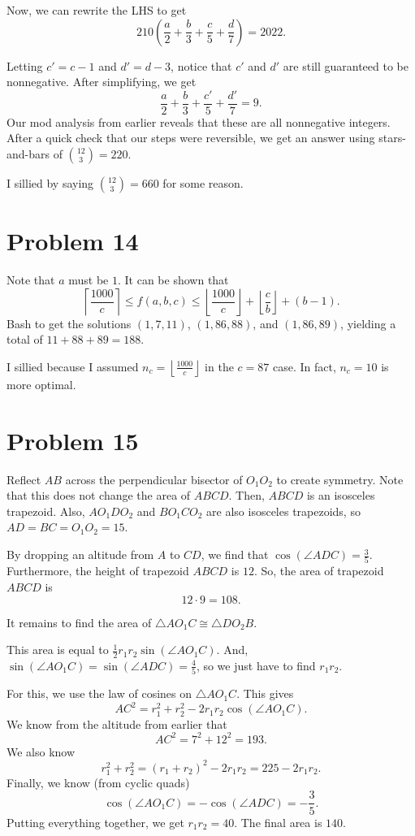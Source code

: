 \documentclass{scrartcl}
\begin{document}
Now, we can rewrite the LHS to get
\[ 210\left(\frac{a}{2} + \frac{b}{3} + \frac{c}{5} + \frac{d}{7}\right) = 2022. \]

Letting $c' = c-1$ and $d' = d-3$, notice that $c'$ and $d'$ are still guaranteed to be nonnegative.
After simplifying, we get
\[ \frac{a}{2} + \frac{b}{3} + \frac{c'}{5} + \frac{d'}{7} = 9. \]
Our mod analysis from earlier reveals that these are all nonnegative integers.
After a quick check that our steps were reversible,
we get an answer using stars-and-bars of $\binom{12}{3} = \boxed{220}$.
\begin{remark*}
    I sillied by saying $\binom{12}{3} = 660$ for some reason.
\end{remark*}

\section*{Problem 14}
Note that $a$ must be $1$.
It can be shown that
\[ \left\lceil \frac{1000}{c} \right\rceil \le f(a,b,c) \le \left\lfloor \frac{1000}{c} \right\rfloor + \left\lfloor \frac{c}{b} \right\rfloor + (b-1). \]
Bash to get the solutions $(1,7,11)$, $(1,86,88)$, and $(1,86,89)$,
yielding a total of $11 + 88 + 89 = \boxed{188}$.
\begin{remark*}
I sillied because I assumed $n_c = \left\lfloor \frac{1000}{c} \right\rfloor$ in the $c=87$ case.
In fact, $n_c = 10$ is more optimal.
\end{remark*}

\section*{Problem 15}
Reflect $AB$ across the perpendicular bisector of $O_1O_2$
to create symmetry.
Note that this does not change the area of $ABCD$.
Then, $ABCD$ is an isosceles trapezoid.
Also, $AO_1DO_2$ and $BO_1CO_2$ are also isosceles trapezoids,
so $AD = BC = O_1O_2 = 15$.

By dropping an altitude from $A$ to $CD$,
we find that $\cos(\angle ADC) = \frac35$.
Furthermore, the height of trapezoid $ABCD$ is $12$.
So, the area of trapezoid $ABCD$ is
\[ 12 \cdot 9 = 108. \]

It remains to find the area of $\triangle AO_1C \cong \triangle DO_2B$.

This area is equal to $\frac12 r_1r_2 \sin (\angle AO_1C)$.
And, $\sin (\angle AO_1C) = \sin (\angle ADC) = \frac45$,
so we just have to find $r_1r_2$.

For this, we use the law of cosines on $\triangle AO_1C$.
This gives
\[ AC^2 = r_1^2 + r_2^2 - 2r_1r_2 \cos (\angle AO_1C). \]
We know from the altitude from earlier that
\[ AC^2 = 7^2 + 12^2 = 193. \]
We also know
\[ r_1^2 + r_2^2 = (r_1 + r_2)^2 - 2r_1r_2 = 225 - 2r_1r_2. \]
Finally, we know (from cyclic quads)
\[ \cos (\angle AO_1C) = -\cos (\angle ADC) = -\frac35. \]
Putting everything together, we get $r_1r_2 = 40$.
The final area is $\boxed{140}$.
\end{document}
